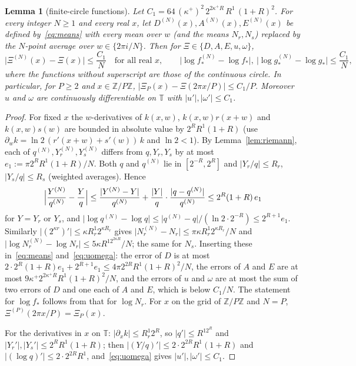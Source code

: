 \documentclass[11pt]{article}
\newtheorem{lemma}{Lemma}[section]
\theoremstyle{definition}
\newcommand{\Z}{\mathbb Z}
\newcommand{\Tc}{\mathbb T}
\newcommand{\abs}[1]{\lvert #1\rvert}
\begin{document}
\begin{lemma}[finite-circle functions]\label{lem:conv}
Let $C_1=64\,(\kappa^+)^2\,2^{2\kappa^+R}\,R^1\,(1+R)^2$. For every integer $N\ge1$ and every real $x$, let
$D^{(N)}(x),A^{(N)}(x),E^{(N)}(x)$ be defined by~\eqref{eq:means} with every mean over $w$ (and the means $N_r,N_s$)
replaced by the $N$-point average over $w\in\{2\pi i/N\}$. Then for $\Xi\in\{D,A,E,u,\omega\}$,
\begin{equation}\label{eq:conv}
 \bigl\lvert\Xi^{(N)}(x)-\Xi(x)\bigr\rvert\le\frac{C_1}{N}\quad\text{for all real }x,\qquad
 \abs{\log f^{(N)}_\ast-\log f_\ast},\ \abs{\log g^{(N)}_\ast-\log g_\ast}\le\frac{C_1}{N},
\end{equation}
where the functions without superscript are those of the continuous circle. In particular, for $P\ge2$ and
$x\in\Z/P\Z$, $\abs{\Xi_P(x)-\Xi(2\pi x/P)}\le C_1/P$. Moreover $u$ and $\omega$ are continuously differentiable on
$\Tc$ with $\abs{u'},\abs{\omega'}\le C_1$.
\end{lemma}
\begin{proof}
For fixed $x$ the $w$-derivatives of $k(x,w)$, $k(x,w)r(x+w)$ and $k(x,w)s(w)$ are bounded in absolute value by
$2^RR^1(1+R)$ (use $\partial_wk=\ln2\,(r'(x+w)+s'(w))\,k$ and $\ln2<1$). By Lemma~\ref{lem:riemann}, each of
$q^{(N)},Y^{(N)}_r,Y^{(N)}_s$ differs from $q,Y_r,Y_s$ by at most $e_1:=\pi2^RR^1(1+R)/N$. Both $q$ and $q^{(N)}$ lie
in $[2^{-R},2^R]$ and $\abs{Y_r/q}\le R_r$, $\abs{Y_s/q}\le R_s$ (weighted averages). Hence
\[
 \Bigl\lvert\frac{Y^{(N)}}{q^{(N)}}-\frac Yq\Bigr\rvert\le\frac{\abs{Y^{(N)}-Y}}{q^{(N)}}+\frac{\abs Y}{q}\cdot\frac{\abs{q-q^{(N)}}}{q^{(N)}}
 \le2^R(1+R)\,e_1
\]
for $Y=Y_r$ or $Y_s$, and $\abs{\log q^{(N)}-\log q}\le\abs{q^{(N)}-q}/(\ln2\cdot2^{-R})\le2^{R+1}e_1$. Similarly
$\abs{(2^{\kappa r})'}\le\kappa R^1_r2^{\kappa R_r}$ gives $\abs{N^{(N)}_r-N_r}\le\pi\kappa R^1_r2^{\kappa R_r}/N$ and
$\abs{\log N^{(N)}_r-\log N_r}\le5\kappa R^12^{2\kappa R}/N$; the same for $N_s$. Inserting these in~\eqref{eq:means}
and~\eqref{eq:uomega}: the error of $D$ is at most $2\cdot2^R(1+R)e_1+2^{R+1}e_1\le4\pi2^{2R}R^1(1+R)^2/N$, the errors
of $A$ and $E$ are at most $9\kappa^+2^{2\kappa^+R}R^1(1+R)^2/N$, and the errors of $u$ and $\omega$ are at most the
sum of two errors of $D$ and one each of $A$ and $E$, which is below $C_1/N$. The statement for $\log f_\ast$
follows from that for $\log N_r$. For $x$ on the grid of $\Z/P\Z$ and $N=P$, $\Xi^{(P)}(2\pi x/P)=\Xi_P(x)$.

For the derivatives in $x$ on $\Tc$: $\abs{\partial_xk}\le R^1_r2^R$, so $\abs{q'}\le R^12^R$ and
$\abs{Y_r'},\abs{Y_s'}\le2^RR^1(1+R)$; then $\abs{(Y/q)'}\le2\cdot2^{2R}R^1(1+R)$ and $\abs{(\log q)'}\le2\cdot2^{2R}R^1$,
and~\eqref{eq:uomega} gives $\abs{u'},\abs{\omega'}\le C_1$.
\end{proof}
\end{document}
